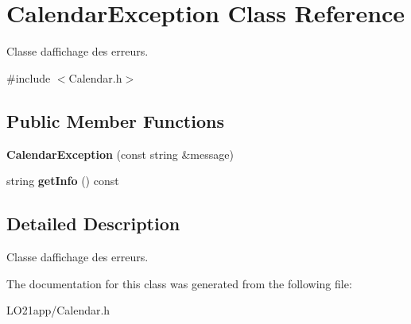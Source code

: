 \hypertarget{class_calendar_exception}{}\section{Calendar\+Exception Class Reference}
\label{class_calendar_exception}


Classe d\textquotesingle{}affichage des erreurs.  




{\ttfamily \#include $<$Calendar.\+h$>$}

\subsection*{Public Member Functions}
\begin{DoxyCompactItemize}
\item 
\hypertarget{class_calendar_exception_af4a976332f7659bdd866926f0145a780}{}{\bfseries Calendar\+Exception} (const string \&message)\label{class_calendar_exception_af4a976332f7659bdd866926f0145a780}

\item 
\hypertarget{class_calendar_exception_a381389e24c3efae51565bc4e7865a7d6}{}string {\bfseries get\+Info} () const \label{class_calendar_exception_a381389e24c3efae51565bc4e7865a7d6}

\end{DoxyCompactItemize}


\subsection{Detailed Description}
Classe d\textquotesingle{}affichage des erreurs. 

The documentation for this class was generated from the following file\+:\begin{DoxyCompactItemize}
\item 
L\+O21app/Calendar.\+h\end{DoxyCompactItemize}
